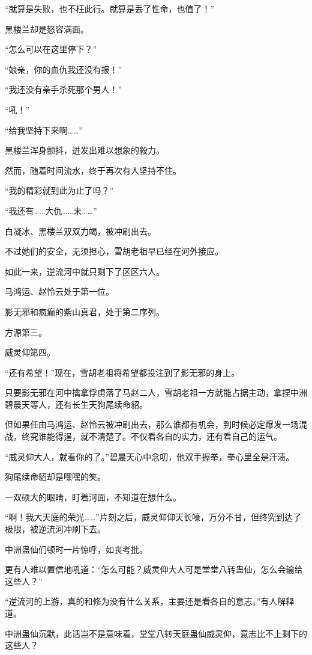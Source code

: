 \begin{this_body}
“就算是失败，也不枉此行。就算是丢了性命，也值了！”

黑楼兰却是怒容满面。

“怎么可以在这里停下？”

“娘亲，你的血仇我还没有报！”

“我还没有亲手杀死那个男人！”

“吼！”

“给我坚持下来啊……”

黑楼兰浑身颤抖，迸发出难以想象的毅力。

然而，随着时间流水，终于再次有人坚持不住。

“我的精彩就到此为止了吗？”

“我还有……大仇……未……”

白凝冰、黑楼兰双双力竭，被冲刷出去。

不过她们的安全，无须担心，雪胡老祖早已经在河外接应。

如此一来，逆流河中就只剩下了区区六人。

马鸿运、赵怜云处于第一位。

影无邪和疯癫的紫山真君，处于第二序列。

方源第三。

威灵仰第四。

“还有希望！”现在，雪胡老祖将希望都投注到了影无邪的身上。

只要影无邪在河中擒拿俘虏落了马赵二人，雪胡老祖一方就能占据主动，拿捏中洲碧晨天等人，还有长生天狗尾续命貂。

但如果任由马鸿运、赵怜云被冲刷出去，那么谁都有机会，到时候必定爆发一场混战，终究谁能得逞，就不清楚了。不仅看各自的实力，还有看自己的运气。

“威灵仰大人，就看你的了。”碧晨天心中念叨，他双手握拳，拳心里全是汗渍。

狗尾续命貂却是嘿嘿的笑。

一双硕大的眼睛，盯着河面，不知道在想什么。

“啊！我大天庭的荣光……”片刻之后，威灵仰仰天长嚎，万分不甘，但终究到达了极限，被逆流河冲刷下去。

中洲蛊仙们顿时一片惊呼，如丧考批。

更有人难以置信地吼道：“怎么可能？威灵仰大人可是堂堂八转蛊仙，怎么会输给这些人？”

“逆流河的上游，真的和修为没有什么关系，主要还是看各自的意志。”有人解释道。

中洲蛊仙沉默，此话岂不是意味着，堂堂八转天庭蛊仙威灵仰，意志比不上剩下的这些人？


\end{this_body}
